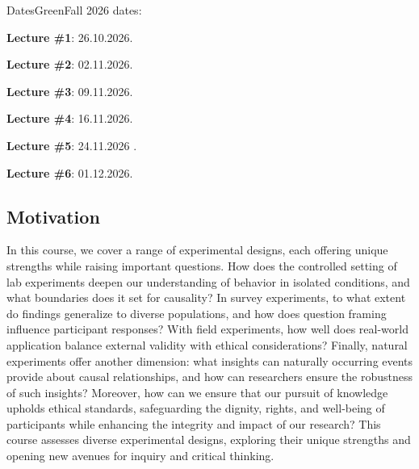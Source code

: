 \documentclass[letterpaper]{article}\usepackage[]{graphicx}\usepackage[svgnames]{xcolor}
\renewenvironment{itemize}{
  \begin{list}{}{
    \setlength{\leftmargin}{1.5em}
  }
}{
  \end{list}
}
\begin{document}
\begin{syllabusbox}{DatesGreen}{Fall 2026 dates:}

\begin{itemize}

\item {\bf Lecture \#1}: 26.10.2026.
\item {\bf Lecture \#2}: 02.11.2026.
\item {\bf Lecture \#3}: 09.11.2026.
\item {\bf Lecture \#4}: 16.11.2026.
\item {\bf Lecture \#5}: 24.11.2026 .
\item {\bf Lecture \#6}: 01.12.2026.

\end{itemize}
\end{syllabusbox}






\subsection*{Motivation}


In this course, we cover a range of experimental designs, each offering unique strengths while raising important questions. How does the controlled setting of lab experiments deepen our understanding of behavior in isolated conditions, and what boundaries does it set for causality? In survey experiments, to what extent do findings generalize to diverse populations, and how does question framing influence participant responses? With field experiments, how well does real-world application balance external validity with ethical considerations? Finally, natural experiments offer another dimension: what insights can naturally occurring events provide about causal relationships, and how can researchers ensure the robustness of such insights? Moreover, how can we ensure that our pursuit of knowledge upholds ethical standards, safeguarding the dignity, rights, and well-being of participants while enhancing the integrity and impact of our research? This course assesses diverse experimental designs, exploring their unique strengths and opening new avenues for inquiry and critical thinking.
\end{document}
